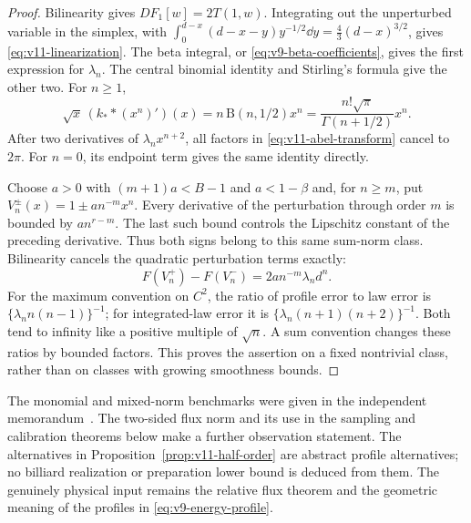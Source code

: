 \begin{proof}
Bilinearity gives $DF_1[w]=2T(1,w)$. Integrating out the unperturbed
variable in the simplex, with
$\int_0^{d-x}(d-x-y)y^{-1/2}\dd y=\tfrac43(d-x)^{3/2}$,
gives \eqref{eq:v11-linearization}. The beta integral, or
\eqref{eq:v9-beta-coefficients}, gives the first expression for
$\lambda_n$. The central binomial identity and Stirling's formula
give the other two. For $n\ge1$,
\[
 \sqrt{x}\,(k_* *(x^n)')(x)
       =n\,\mathrm B(n,1/2)x^n
       =\frac{n!\sqrt\pi}{\Gamma(n+1/2)}x^n.
\]
After two derivatives of $\lambda_n x^{n+2}$, all factors in
\eqref{eq:v11-abel-transform} cancel to $2\pi$. For $n=0$, its
endpoint term gives the same identity directly.

Choose $a>0$ with $(m+1)a<B-1$ and $a<1-\beta$ and, for
$n\ge m$, put $V_n^\pm(x)=1\pm a n^{-m}x^n$. Every derivative
of the perturbation through order $m$ is bounded by $a n^{r-m}$.
The last such bound controls the Lipschitz constant of the preceding
derivative. Thus both signs belong to this same sum-norm class.
Bilinearity cancels the quadratic perturbation terms exactly:
\[
 F(V_n^+)-F(V_n^-)=2a n^{-m}\lambda_n d^n.
\]
For the maximum convention on $C^2$, the ratio of profile error to
law error is $\{\lambda_n n(n-1)\}^{-1}$; for integrated-law
error it is $\{\lambda_n(n+1)(n+2)\}^{-1}$. Both tend to
infinity like a positive multiple of $\sqrt n$. A sum convention
changes these ratios by bounded factors. This proves the assertion
on a fixed nontrivial class, rather than on classes with growing
smoothness bounds.
\end{proof}

The monomial and mixed-norm benchmarks were given in the independent
memorandum~\cite{A2ReviewV10}. The two-sided flux norm and its use
in the sampling and calibration theorems below make a further
observation statement. The alternatives in
Proposition~\ref{prop:v11-half-order} are abstract profile alternatives;
no billiard realization or preparation lower bound is deduced from
them. The genuinely physical input remains the relative flux theorem
and the geometric meaning of the profiles in
\eqref{eq:v9-energy-profile}.
